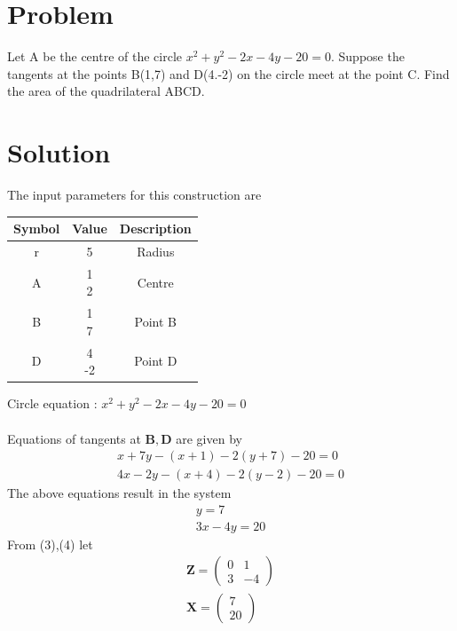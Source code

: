 \documentclass[10pt, a4paper]{article}
\title{\mytitle}
\author{\myauthor\hspace{1em}\\\contact\\FWC22034\hspace{6.5em}IITH\hspace{0.5em}\mymodule\hspace{6em}September}
\date{}
\newcommand{\myvec}[1]{\ensuremath{\begin{pmatrix}#1\end{pmatrix}}}
\let\vec\mathbf
\begin{document}
	\maketitle
	\tableofcontents
   \section{Problem}
  Let A be the centre of the circle $x^2 + y^2-2x-4y-20=0$. Suppose the tangents at the points  B(1,7) and D(4.-2) on the circle meet at the point C. Find the area of the quadrilateral ABCD.

   \section{Solution}
   The input parameters for this construction are 
\begin{center}
\begin{tabular}{|c|c|c|}
	\hline
	\textbf{Symbol}&\textbf{Value}&\textbf{Description}\\
	\hline
	r&5&Radius\\
	\hline
	A&\myvec{1\\2}& Centre\\
	\hline
    B&\myvec{1\\7}&Point B\\
	\hline
	D&\myvec{4\\-2}&Point D\\
	\hline
\end{tabular}
\end{center}
Circle equation : $x^2+y^2-2x-4y-20=0$   \\~\\
Equations of tangents at $\vec{B} , \vec{D}$ are given by
\begin{align}
x+7y-(x+1)-2(y+7)-20=0\\
4x-2y-(x+4)-2(y-2)-20=0
\end{align}
The above equations result in the system 
\begin{align}
y=7\\
3x-4y=20
\end{align}
From (3),(4) let
\begin{align}
\vec{Z}=\myvec{0 & 1  \\
		3 & -4} \\   
\vec{X}=\myvec{7 \\ 20 }
\end{align}
\end{document}
